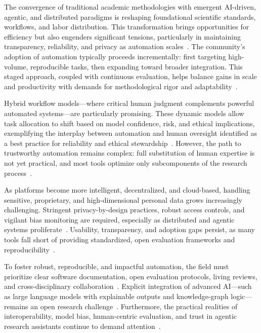 \documentclass[sigconf]{acmart}
\begin{document}
The convergence of traditional academic methodologies with emergent AI-driven, agentic, and distributed paradigms is reshaping foundational scientific standards, workflows, and labor distribution. This transformation brings opportunities for efficiency but also engenders significant tensions, particularly in maintaining transparency, reliability, and privacy as automation scales~\cite{ref25,ref26,ref40,ref52,ref56,ref61,ref64,ref69,ref80}. The community's adoption of automation typically proceeds incrementally: first targeting high-volume, reproducible tasks, then expanding toward broader integration. This staged approach, coupled with continuous evaluation, helps balance gains in scale and productivity with demands for methodological rigor and adaptability~\cite{ref28,ref31,ref51,ref78}. 

Hybrid workflow models—where critical human judgment complements powerful automated systems—are particularly promising. These dynamic models allow task allocation to shift based on model confidence, risk, and ethical implications, exemplifying the interplay between automation and human oversight identified as a best practice for reliability and ethical stewardship~\cite{ref51,ref64,ref83,ref96,ref97}. However, the path to trustworthy automation remains complex: full substitution of human expertise is not yet practical, and most tools optimize only subcomponents of the research process~\cite{ref28,ref31,ref96,ref97,ref80}.

As platforms become more intelligent, decentralized, and cloud-based, handling sensitive, proprietary, and high-dimensional personal data grows increasingly challenging. Stringent privacy-by-design practices, robust access controls, and vigilant bias monitoring are required, especially as distributed and agentic systems proliferate~\cite{ref61,ref62,ref80,ref102,ref112,ref113}. Usability, transparency, and adoption gaps persist, as many tools fall short of providing standardized, open evaluation frameworks and reproducibility~\cite{ref31,ref80}. 

To foster robust, reproducible, and impactful automation, the field must prioritize clear software documentation, open evaluation protocols, living reviews, and cross-disciplinary collaboration~\cite{ref28,ref31,ref51,ref70,ref78,ref80}. Explicit integration of advanced AI—such as large language models with explainable outputs and knowledge-graph logic—remains an open research challenge~\cite{ref64,ref80}. Furthermore, the practical realities of interoperability, model bias, human-centric evaluation, and trust in agentic research assistants continue to demand attention~\cite{ref51,ref64,ref80,ref96,ref97}.
\end{document}
